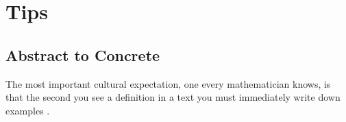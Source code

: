 \section{Tips}
\subsection{Abstract to Concrete}
The most important cultural expectation, one every mathematician knows, is that the
second you see a definition in a text you must immediately write down examples
\cite{kun2018}.
